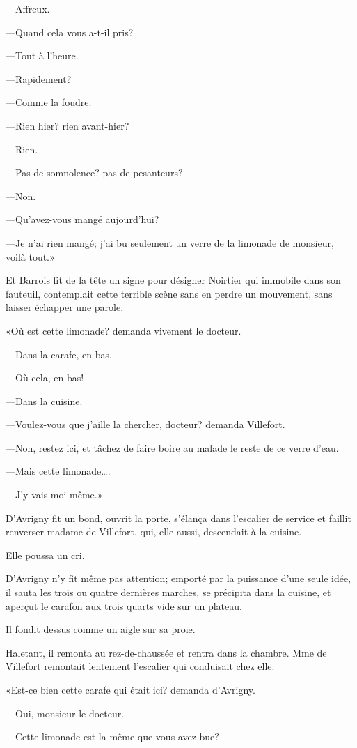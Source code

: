 —Affreux. 

—Quand cela vous a-t-il pris? 

—Tout à l'heure. 

—Rapidement? 

—Comme la foudre.  

—Rien hier? rien avant-hier? 

—Rien. 

—Pas de somnolence? pas de pesanteurs? 

—Non. 

—Qu'avez-vous mangé aujourd'hui? 

—Je n'ai rien mangé; j'ai bu seulement un verre de la limonade de monsieur, voilà tout.» 

Et Barrois fit de la tête un signe pour désigner Noirtier qui immobile dans son fauteuil, contemplait cette terrible scène sans en perdre un mouvement, sans laisser échapper une parole. 

«Où est cette limonade? demanda vivement le docteur. 

—Dans la carafe, en bas. 

—Où cela, en bas! 

—Dans la cuisine. 

—Voulez-vous que j'aille la chercher, docteur? demanda Villefort. 

—Non, restez ici, et tâchez de faire boire au malade le reste de ce verre d'eau. 

—Mais cette limonade\dots. 

—J'y vais moi-même.» 

D'Avrigny fit un bond, ouvrit la porte, s'élança dans l'escalier de service et faillit renverser madame de Villefort, qui, elle aussi, descendait à la cuisine. 

Elle poussa un cri. 

D'Avrigny n'y fit même pas attention; emporté par la puissance d'une seule idée, il sauta les trois ou quatre dernières marches, se précipita dans la cuisine, et aperçut le carafon aux trois quarts vide sur un plateau. 

Il fondit dessus comme un aigle sur sa proie. 

Haletant, il remonta au rez-de-chaussée et rentra dans la chambre. Mme de Villefort remontait lentement l'escalier qui conduisait chez elle. 

«Est-ce bien cette carafe qui était ici? demanda d'Avrigny. 

—Oui, monsieur le docteur. 

—Cette limonade est la même que vous avez bue? 

